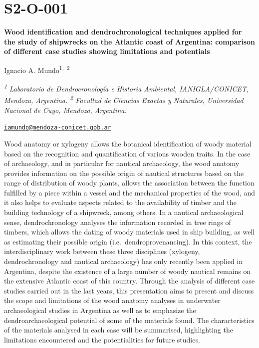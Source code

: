 \documentclass[
]{book}
\begin{document}
\hypertarget{s2-o-001}{%
\section*{S2-O-001}\label{s2-o-001}}

\textbf{Wood identification and dendrochronological techniques applied for the study of shipwrecks on the Atlantic coast of Argentina: comparison of different case studies showing limitations and potentials}

Ignacio A. Mundo\textsuperscript{1,~2}

\textsuperscript{\emph{1}} \emph{Laboratorio de Dendrocronología e Historia Ambiental, IANIGLA/CONICET, Mendoza, Argentina. \textsuperscript{2} Facultad de Ciencias Exactas y Naturales, Universidad Nacional de Cuyo, Mendoza, Argentina.}

\href{mailto:iamundo@mendoza-conicet.gob.ar}{\nolinkurl{iamundo@mendoza-conicet.gob.ar}}

Wood anatomy or xylogeny allows the botanical identification of woody material based on the recognition and quantification of various wooden traits. In the case of archaeology, and in particular for nautical archaeology, the wood anatomy provides information on the possible origin of nautical structures based on the range of distribution of woody plants, allows the association between the function fulfilled by a piece within a vessel and the mechanical properties of the wood, and it also helps to evaluate aspects related to the availability of timber and the building technology of a shipwreck, among others. In a nautical archaeological sense, dendrochronology analyses the information recorded in tree rings of timbers, which allows the dating of woody materials used in ship building, as well as estimating their possible origin (i.e.~dendroprovenancing). In this context, the interdisciplinary work between these three disciplines (xylogeny, dendrochronology and nautical archaeology) has only recently been applied in Argentina, despite the existence of a large number of woody nautical remains on the extensive Atlantic coast of this country. Through the analysis of different case studies carried out in the last years, this presentation aims to present and discuss the scope and limitations of the wood anatomy analyses in underwater archaeological studies in Argentina as well as to emphasize the dendroarchaeological potential of some of the materials found. The characteristics of the materials analysed in each case will be summarised, highlighting the limitations encountered and the potentialities for future studies.
\end{document}

